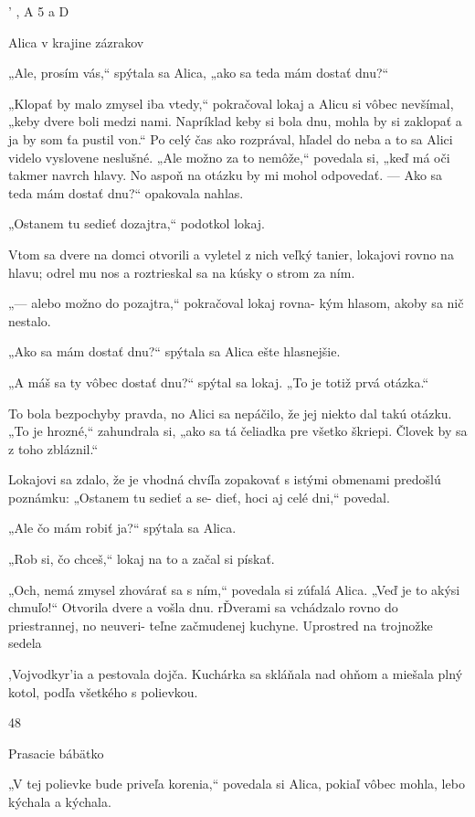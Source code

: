 \documentclass[12pt]{book}
\begin{document}
\begin{Parallel}[p]{}{}
{ 

' , A
5 a
D

Alica v krajine zázrakov

„Ale, prosím vás,“ spýtala sa Alica, „ako sa teda mám
dostať dnu?“

„Klopať by malo zmysel iba vtedy,“ pokračoval lokaj
a Alicu si vôbec nevšímal, „keby dvere boli medzi nami.
Napríklad keby si bola dnu, mohla by si zaklopať a ja by
som ťa pustil von.“ Po celý čas ako rozprával, hľadel do neba
a to sa Alici videlo vyslovene neslušné. „Ale možno za to
nemôže,“ povedala si, „keď má oči takmer navrch hlavy. No
aspoň na otázku by mi mohol odpovedať. — Ako sa teda
mám dostať dnu?“ opakovala nahlas.

„Ostanem tu sedieť dozajtra,“ podotkol lokaj.

Vtom sa dvere na domci otvorili a vyletel z nich veľký
tanier, lokajovi rovno na hlavu; odrel mu nos a roztrieskal
sa na kúsky o strom za ním.

„— alebo možno do pozajtra,“ pokračoval lokaj rovna-
kým hlasom, akoby sa nič nestalo.

„Ako sa mám dostať dnu?“ spýtala sa Alica ešte
hlasnejšie.

„A máš sa ty vôbec dostať dnu?“ spýtal sa lokaj. „To je
totiž prvá otázka.“

To bola bezpochyby pravda, no Alici sa nepáčilo, že jej
niekto dal takú otázku. „To je hrozné,“ zahundrala si, „ako
sa tá čeliadka pre všetko škriepi. Človek by sa z toho
zbláznil.“

Lokajovi sa zdalo, že je vhodná chvíľa zopakovať s istými
obmenami predošlú poznámku: „Ostanem tu sedieť a se-
dieť, hoci aj celé dni,“ povedal.

„Ale čo mám robiť ja?“ spýtala sa Alica.

„Rob si, čo chceš,“ lokaj na to a začal si pískať.

„Och, nemá zmysel zhovárať sa s ním,“ povedala si zúfalá
Alica. „Veď je to akýsi chmuľo!“ Otvorila dvere a vošla
dnu.
rĎverami sa vchádzalo rovno do priestrannej, no neuveri-
teľne začmudenej kuchyne. Uprostred na trojnožke sedela

,Vojvodkyr'ia a pestovala dojča. Kuchárka sa skláňala nad
ohňom a miešala plný kotol, podľa všetkého s polievkou.

48

Prasacie bábätko

„V tej polievke bude priveľa korenia,“ povedala si Alica,
pokiaľ vôbec mohla, lebo kýchala a kýchala.

}
\end{Parallel}
\end{document}
